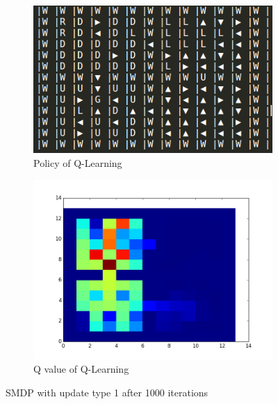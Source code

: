 \documentclass[]{article}
\begin{document}
\begin{figure}
	\centering
	\begin{subfigure}[b]{0.475\textwidth}
		\includegraphics[width=\linewidth]{update_1_policy.png}
		\caption{Policy of Q-Learning}
	\end{subfigure}
	\begin{subfigure}[b]{0.475\textwidth}
		\centering
		\includegraphics[width=.9\linewidth]{update_1_value_plot.png}
		\caption{Q value of Q-Learning}
	\end{subfigure}
	\caption{SMDP with update type 1 after 1000 iterations}
\end{figure}
\end{document}

